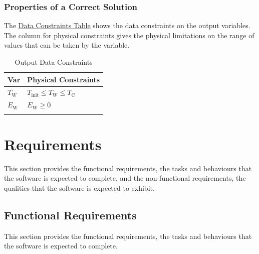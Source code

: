 \documentclass[12pt]{article}
\begin{document}
\subsubsection{Properties of a Correct Solution}
\label{Sec:CorSolProps}
The \hyperref[Table:OutDataConstraints]{Data Constraints Table} shows the data constraints on the output variables. The column for physical constraints gives the physical limitations on the range of values that can be taken by the variable.

\begin{longtable}{l l}
\toprule
\textbf{Var} & \textbf{Physical Constraints}
\\
\midrule
\endhead
${T_{\text{W}}}$ & ${T_{\text{init}}}\leq{}{T_{\text{W}}}\leq{}{T_{\text{C}}}$
\\
${E_{\text{W}}}$ & ${E_{\text{W}}}\geq{}0$
\\
\bottomrule
\caption{Output Data Constraints}
\label{Table:OutDataConstraints}
\end{longtable}
\section{Requirements}
\label{Sec:Requirements}
This section provides the functional requirements, the tasks and behaviours that the software is expected to complete, and the non-functional requirements, the qualities that the software is expected to exhibit.

\subsection{Functional Requirements}
\label{Sec:FRs}
This section provides the functional requirements, the tasks and behaviours that the software is expected to complete.
\end{document}
